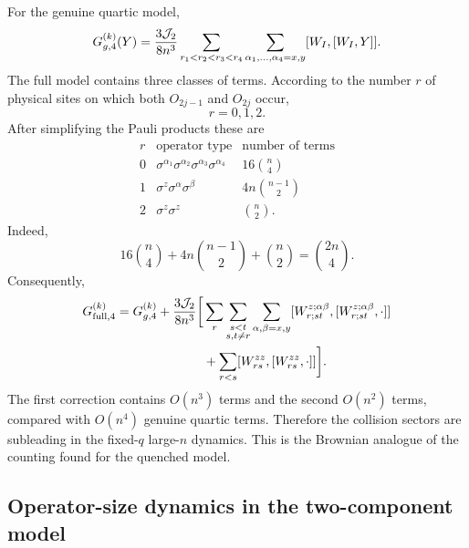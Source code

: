 \documentclass{article}
\theoremstyle{definition}
\begin{document}
For the genuine quartic model,
\begin{equation}
    G_{g,4}^{(k)}(Y)
    =
    \frac{3{\cal J}_2}{8n^3}
    \sum_{r_1<r_2<r_3<r_4}
    \sum_{\alpha_1,\ldots,\alpha_4=x,y}
    [W_I,[W_I,Y]] .
    \label{eq:spinbrown_BDN_q4_genuine}
\end{equation}
The full model contains three classes of terms.  According to the number
$r$ of physical sites on which both $O_{2j-1}$ and $O_{2j}$ occur,
\begin{equation}
    r=0,1,2.
\end{equation}
After simplifying the Pauli products these are
\begin{equation}
    \begin{array}{c|c|c}
    r & \text{operator type} & \text{number of terms}\\ \hline
    0 &
    \sigma^{\alpha_1}\sigma^{\alpha_2}
    \sigma^{\alpha_3}\sigma^{\alpha_4}
    &
    16\binom n4
    \\[2mm]
    1 &
    \sigma^z\sigma^\alpha\sigma^\beta
    &
    4n\binom{n-1}{2}
    \\[2mm]
    2 &
    \sigma^z\sigma^z
    &
    \binom n2 .
    \end{array}
    \label{eq:spinbrown_BDN_q4_classes}
\end{equation}
Indeed,
\begin{equation}
    16\binom n4
    +
    4n\binom{n-1}{2}
    +
    \binom n2
    =
    \binom{2n}{4}.
\end{equation}
Consequently,
\begin{align}
    G_{{\rm full},4}^{(k)}
    =
    G_{g,4}^{(k)}
    +
    \frac{3{\cal J}_2}{8n^3}
    \bigg[
       &
       \sum_r
       \sum_{\substack{s<t\\s,t\neq r}}
       \sum_{\alpha,\beta=x,y}
       [W_{r;st}^{z;\alpha\beta},
        [W_{r;st}^{z;\alpha\beta},\cdot]]
       \nonumber\\
       &+
       \sum_{r<s}
       [W_{rs}^{zz},
        [W_{rs}^{zz},\cdot]]
    \bigg].
    \label{eq:spinbrown_BDN_q4_full}
\end{align}
The first correction contains $O(n^3)$ terms and the second $O(n^2)$
terms, compared with $O(n^4)$ genuine quartic terms.  Therefore the
collision sectors are subleading in the fixed-$q$ large-$n$ dynamics.
This is the Brownian analogue of the counting found for the quenched
model.


\subsection{Operator-size dynamics in the two-component model}
\label{subsec:BDN_size_dynamics}
\end{document}
